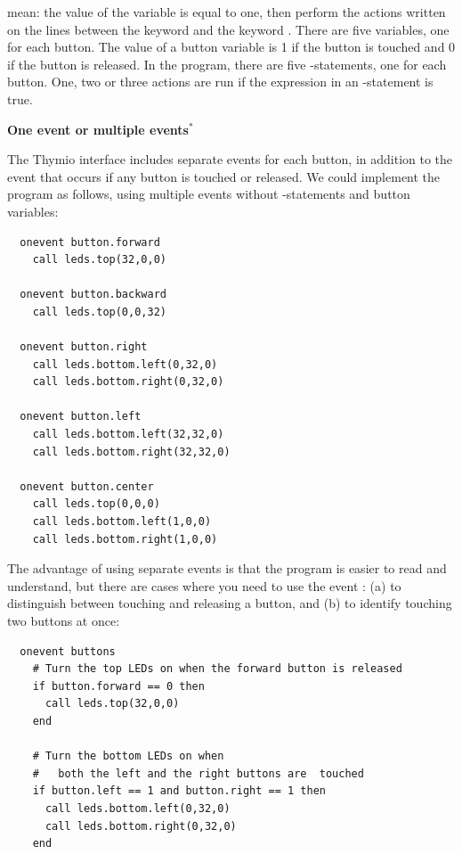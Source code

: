 \documentclass[11pt,a4paper,english]{report}
\begin{document}
mean:  the value of the variable  is equal to
one, then perform the actions written on the lines between the keyword
 and the keyword . There are five  variables,
one for each button. The value of a button variable is 1 if the button
is touched and 0 if the button is released. In the program, there are
five -statements, one for each button. One, two or three actions
are run if the expression in an -statement is true.

\textbf{\large One event or multiple events$^*$}

The Thymio interface includes separate events for each button, in
addition to the  event that occurs if any button is touched
or released. We could implement the program as follows, using multiple
events without -statements and button variables:

\begin{footnotesize}
\begin{verbatim}
  onevent button.forward
    call leds.top(32,0,0)
  
  onevent button.backward
    call leds.top(0,0,32)
  
  onevent button.right
    call leds.bottom.left(0,32,0)
    call leds.bottom.right(0,32,0)
  
  onevent button.left
    call leds.bottom.left(32,32,0)
    call leds.bottom.right(32,32,0)
  
  onevent button.center
    call leds.top(0,0,0)
    call leds.bottom.left(1,0,0)
    call leds.bottom.right(1,0,0)
\end{verbatim}
\end{footnotesize}

The advantage of using separate events is that the program is easier to
read and understand, but there are cases where you need to use the event
: (a) to distinguish between touching and releasing a button,
and (b) to identify touching two buttons at once:

\begin{footnotesize}
\begin{verbatim}
  onevent buttons
    # Turn the top LEDs on when the forward button is released
    if button.forward == 0 then
      call leds.top(32,0,0)
    end

    # Turn the bottom LEDs on when
    #   both the left and the right buttons are  touched
    if button.left == 1 and button.right == 1 then
      call leds.bottom.left(0,32,0)
      call leds.bottom.right(0,32,0)
    end
\end{verbatim}
\end{footnotesize}
\end{document}
